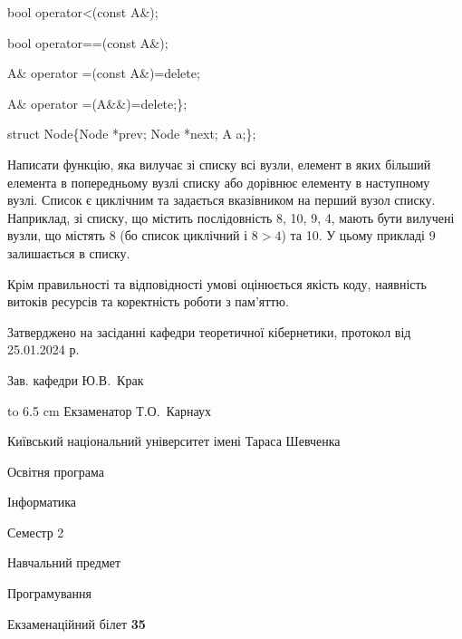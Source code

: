 \documentclass[12pt, ukrainian]{article}
\begin{document}
{\quad  bool operator<(const A\&); 

\quad  bool operator==(const A\&); 

\quad A\& operator =(const A\&)=delete; 

\quad  A\& operator =(A\&\&)=delete;\};

struct Node\{Node *prev; Node *next; A a;\};

Написати функцію, яка вилучає зі списку всі вузли, елемент в яких більший елемента в попередньому вузлі списку або дорівнює елементу в наступному вузлі. Список є циклічним та задається вказівником на перший вузол списку. Наприклад, зі списку, що містить послідовність 8, 10, 9, 4, мають бути вилучені вузли, що містять 8 (бо список циклічний і $8>4$) та 10. У цьому прикладі 9 залишається в списку.

Крім правильності та відповідності умові оцінюється якість коду, наявність витоків ресурсів та коректність роботи з пам'яттю. 

}
{\smallskip\smallskip \begin {scriptsize} Затверджено на засіданні кафедри теоретичної кібернетики, протокол   від   25.01.2024 р.\par\smallskip\smallskip\smallskip\smallskip
{\parbox {6.5 cm} {Зав. кафедри \dotfill Ю.В.~Крак}}\hspace {0.7cm} {\hbox to 6.5 cm { Екзаменатор \dotfill Т.О.~Карнаух}} \end{scriptsize}}
\newpage
{{\begin {scriptsize}\par
{ \center  Київський національний університет імені Тараса Шевченка \par}
{\parbox {5 cm}{Освітня програма \hfill}{\parbox {7 cm}{Інформатика\hfill}}\parbox {6 cm}{\hfill Семестр 2}}\par
{\parbox {5 cm} {Навчальний предмет \hfill}\parbox {7 cm}{Програмування \hfill}\parbox {6cm}{\hfill}\par}\vspace{-15pt} \end{scriptsize}}{\center Екзаменаційний білет \No \textbf { 35 }\par}}
\end{document}
